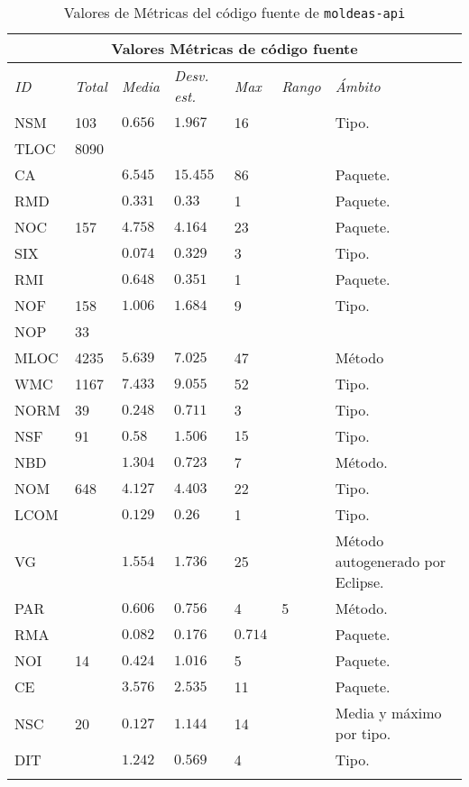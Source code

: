    \begin{longtable}{|p{1.5cm}|p{1.5cm}|p{1.5cm}|p{1.5cm}|p{1cm}|p{2cm}|p{2.5cm}|}

      \hline 
	    \multicolumn{7}{|c|}{\textbf{Valores Métricas de código fuente}}\\ \hline
	    \textit{ID} &  \textit{Total} &  \textit{Media}&  \textit{Desv. est.} & \textit{Max}& \textit{Rango}& \textit{Ámbito} \\ \hline
      \endhead
		NSM&103&$0.656$&$1.967$&16& \na &Tipo. \\ \hline
		TLOC&8090&\na&\na&\na&\na&\na \\ \hline
		CA&\na&$6.545$&$15.455$&86&\na&Paquete.\\ \hline
		RMD&\na&$0.331$&$0.33$&1&\na&Paquete. \\ \hline
		NOC&157&$4.758$&$4.164$&23&\na&Paquete. \\ \hline 
		SIX&\na&$0.074$&$0.329$&3&\na&Tipo. \\		\hline 
		RMI&\na&$0.648$&$0.351$&1&\na&Paquete. \\ \hline
		NOF&158&$1.006$&$1.684$&9&\na&Tipo. \\ \hline
		NOP&33&\na&\na&\na&\na&\na \\ \hline
		MLOC&4235&$5.639$&$7.025$&47&\na&Método \\ \hline
		WMC&1167&$7.433$&$9.055$&52&\na&Tipo. \\ \hline
		NORM&39&$0.248$&$0.711$&3&\na&Tipo. \\ \hline
		NSF&91&$0.58$&$1.506$&$15$&\na&Tipo. \\ \hline
		NBD&\na&$1.304$&$0.723$&7&\na&Método. \\ \hline
		NOM&648&$4.127$&$4.403$&22&\na&Tipo. \\		\hline 
		LCOM&\na&$0.129$&$0.26$&1&\na&Tipo. \\ \hline 
		VG&\na&$1.554$&$1.736$&25&\na&Método autogenerado por Eclipse. \\ \hline
		PAR&\na&$0.606$&$0.756$&4&5&Método.\\ \hline 
		RMA&\na&$0.082$&$0.176$&$0.714$&\na&Paquete. \\ \hline
		NOI&14&$0.424$&$1.016$&5&\na&Paquete. \\ \hline
		CE&\na&$3.576$&$2.535$&11&\na&Paquete. \\ \hline
		NSC&20&$0.127$&$1.144$&14&\na&Media y máximo por tipo. \\ \hline
		DIT&\na&$1.242$&$0.569$&4&\na&Tipo. \\ \hline
    	 \hline
        \caption{Valores de Métricas del código fuente de \texttt{moldeas-api}} \label{tabla:metricas-valores}\\
        \end{longtable}    
  
